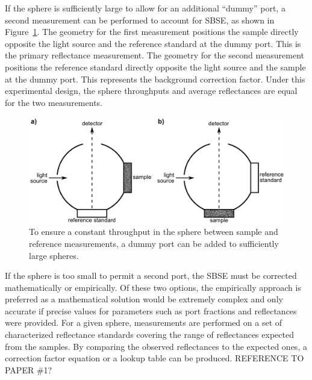If the sphere is sufficiently large to allow for an additional ``dummy'' port, a second measurement can be performed to account for SBSE, as shown in Figure~\ref{fig:intro-is_compar}.\cite{Labspherec} The geometry for the first measurement positions the sample directly opposite the light source and the reference standard at the dummy port. This is the primary reflectance measurement. The geometry for the second measurement positions the reference standard directly opposite the light source and the sample at the dummy port. This represents the background correction factor. Under this experimental design, the sphere throughputs and average reflectances are equal for the two measurements.

\begin{figure}
	\centering \includegraphics[width=1.0\textwidth]{figures/intro-is_compar.png}
	\caption[The comparison method for measuring sample reflectance]{\label{fig:intro-is_compar}To ensure a constant throughput in the sphere between sample and reference measurements, a dummy port can be added to sufficiently large spheres.}
\end{figure}

If the sphere is too small to permit a second port, the SBSE must be corrected mathematically or empirically. Of these two options, the empirically approach is preferred as a mathematical solution would be extremely complex and only accurate if precise values for parameters such as port fractions and reflectances were provided. For a given sphere, measurements are performed on a set of characterized reflectance standards covering the range of reflectances expected from the samples. By comparing the observed reflectances to the expected ones, a correction factor equation or a lookup table can be produced. REFERENCE TO PAPER \#1?

